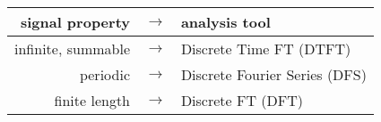 \begin{center}
    \renewcommand{\tabcolsep}{3pt}
    \renewcommand{\arraystretch}{1.2}
    \begin{tabular}{rcl}
        \bf signal property & $\to$ & \bf analysis tool \\ \hline
        infinite, summable & $\to$ & Discrete Time FT (DTFT) \\
        periodic & $\to$ & Discrete Fourier Series (DFS) \\
        finite length & $\to$ & Discrete FT (DFT)
    \end{tabular}
\end{center}